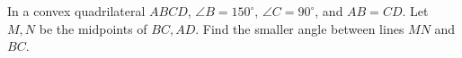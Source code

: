 In a convex quadrilateral $ABCD$, $\angle B=150^\circ$, $\angle C=90^\circ$, and $AB=CD$. Let $M,N$ be the midpoints of $BC,AD$. Find the smaller angle between lines $MN$ and $BC$.
